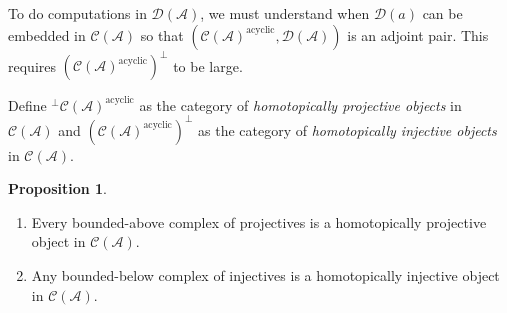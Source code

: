 \documentclass[10pt,letterpaper,cm]{nupset}
\theoremstyle{definition}
\theoremstyle{theorem}
\newtheorem{prop}[definition]{Proposition}
\theoremstyle{remark}
\newcommand{\D}{\mathcal{D}}
\newcommand{\1}{\mathbf{1}}
\renewcommand{\a}{\mathscr{A}}
\newcommand{\0}{\vec 0}
\DeclareMathOperator{\acyc}{acyclic}
\begin{document}
To do computations in $\D(\a)$, we must understand when $\D(a)$ can be embedded in $\mathcal{C}(\a)$ so that $\left(\mathcal{C}(\a)^{\acyc}, \D(\a)\right)$ is an adjoint pair. This requires $(\mathcal{C}(\a)^{\acyc})^{\perp}$  to be large. 

\medskip

Define ${^{\perp}{\mathcal{C}(\a)^{\acyc}}}$ as the category of \textit{homotopically projective objects} in $\mathcal{C}(\a)$ and $\left(\mathcal{C}(\a)^{\acyc}\right)^{\perp}$ as the category of \textit{homotopically injective objects} in $\mathcal{C}(\a)$. 


\begin{prop} $ $
\begin{enumerate}
\item Every bounded-above complex of projectives is a homotopically projective object in $\mathcal{C}(\a)$.
\item Any bounded-below complex of injectives is a homotopically injective object in $\mathcal{C}(\a)$. 
\end{enumerate}
\end{prop}
\end{document}
